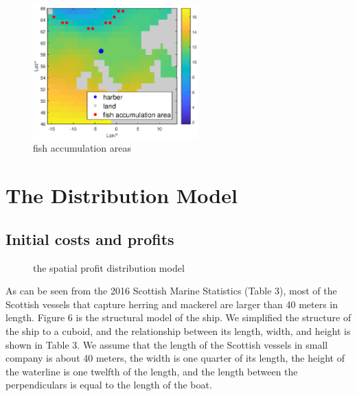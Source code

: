 \documentclass{mcmthesis}
\begin{document}
\begin{figure}[htbp]
{\begin{minipage}[t]{0.5\linewidth}
  \centering
  \includegraphics[width=2.5in]{image/fish_area_after50years.eps}
  \end{minipage}%
  }
  \centering
  \caption{fish accumulation areas}
\end{figure}

\section{The Distribution Model}
\subsection{Initial costs and profits}
\begin{figure}[ht]
  \caption{the spatial profit distribution model}
\end{figure}


As can be seen from the 2016 Scottish Marine Statistics (Table 3), most of the Scottish vessels that capture herring and mackerel are larger than 40 meters in length. Figure 6 is the structural model of the ship. We simplified the structure of the ship to a cuboid, and the relationship between its length, width, and height is shown in Table 3. We assume that the length of the Scottish vessels in small company is about 40 meters, the width is one quarter of its length, the height of the waterline is one twelfth of the length, and the length between the  perpendiculars  is equal to the length of the boat.
\end{document}
